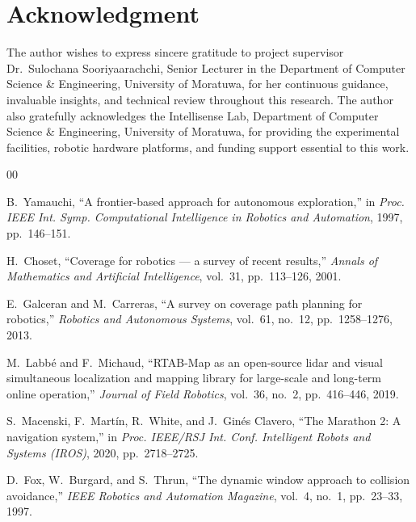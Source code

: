 \documentclass[conference,a4paper,10pt]{IEEEtran}
\begin{document}
\section*{Acknowledgment}
The author wishes to express sincere gratitude to project supervisor Dr.~Sulochana Sooriyaarachchi, Senior Lecturer in the Department of Computer Science \& Engineering, University of Moratuwa, for her continuous guidance, invaluable insights, and technical review throughout this research. The author also gratefully acknowledges the Intellisense Lab, Department of Computer Science \& Engineering, University of Moratuwa, for providing the experimental facilities, robotic hardware platforms, and funding support essential to this work.

\begin{thebibliography}{00}

 B.~Yamauchi, ``A frontier-based approach for autonomous
exploration,'' in \emph{Proc. IEEE Int. Symp. Computational Intelligence in
Robotics and Automation}, 1997, pp.~146--151.

 H.~Choset, ``Coverage for robotics --- a survey of recent
results,'' \emph{Annals of Mathematics and Artificial Intelligence}, vol.~31,
pp.~113--126, 2001.

 E.~Galceran and M.~Carreras, ``A survey on coverage path
planning for robotics,'' \emph{Robotics and Autonomous Systems}, vol.~61,
no.~12, pp.~1258--1276, 2013.

 M.~Labb\'{e} and F.~Michaud, ``RTAB-Map as an open-source
lidar and visual simultaneous localization and mapping library for large-scale
and long-term online operation,'' \emph{Journal of Field Robotics}, vol.~36,
no.~2, pp.~416--446, 2019.

 S.~Macenski, F.~Mart\'{i}n, R.~White, and J.~Gin\'{e}s Clavero,
``The Marathon 2: A navigation system,'' in \emph{Proc. IEEE/RSJ Int. Conf.
Intelligent Robots and Systems (IROS)}, 2020, pp.~2718--2725.

 D.~Fox, W.~Burgard, and S.~Thrun, ``The dynamic window approach
to collision avoidance,'' \emph{IEEE Robotics and Automation Magazine}, vol.~4,
no.~1, pp.~23--33, 1997.

\end{thebibliography}
\end{document}
